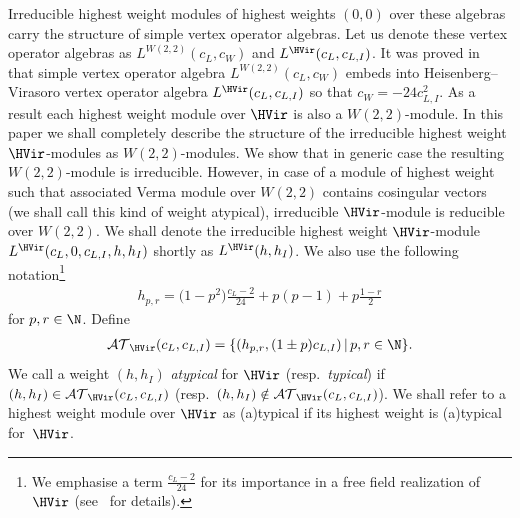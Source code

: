 Irreducible highest weight modules of highest weights $(0,0)$ over these algebras carry the structure of simple vertex operator algebras. Let us denote these vertex operator algebras as $L^{W(2,2)} (c_L, c_W)$ and $L^{\HVir} (c_L, c_{L,I} )$. It was proved in~\cite{nas} that simple vertex operator algebra $L^{W(2,2)} (c_L, c_W)$ embeds into Heisenberg--Virasoro vertex operator algebra $L^{\HVir} (c_L, c_{L,I} )$ so that $c_W = -24 c_{L,I} ^2$. As a result each highest weight module over $\HVir$ is also a $W(2,2)$-module. In this paper we shall completely describe the structure of the irreducible highest weight $\HVir$-modules as $W(2,2)$-modules. We show that in generic case the resulting $W(2,2)$-module is irreducible. However, in case of a module of highest weight such that associated Verma module over $W(2,2)$ contains cosingular vectors (we shall call this kind of weight atypical), irreducible $\HVir$-module is reducible over $W(2,2)$.
We shall denote the irreducible highest weight $ \HVir $-module $L^{\HVir}(c_L,0,c_{L,I},h,h_I) $ shortly as $L^{\HVir}(h,h_I)$.
 We also use the following notation\footnote{We emphasise a term $\frac{c_L-2}{24} $ for its importance in a free f\/ield realization of $\HVir $ (see~\cite{nas} for details).}
\begin{gather*}
h_{p,r}=\big(1-p^{2}\big)\frac{c_{L}-2}{24}+p(p-1)+p\frac{1-r}{2} %
\end{gather*}
for $ p,r \in \N $. Def\/ine
\begin{gather*}
{\mathcal {AT} }_{\HVir} ( c_L, c_{L,I} ) = \{ (h_{p,r},(1\pm p)c_{L,I}) \,|\, p,r \in \N \}.
\end{gather*}
We call a weight $(h,h_I)$ \textit{atypical} for $\HVir $ (resp.\ \textit{typical}) if $(h,h_I) \in {\mathcal {AT} } _{\HVir} ( c_L, c_{L,I} ) $ (resp.\ $(h,h_I) \notin {\mathcal {AT} } _{\HVir} ( c_L, c_{L,I} ) $). We shall refer to a highest weight module over $\HVir$ as (a)typical if its highest weight is (a)typical for~$\HVir$.

